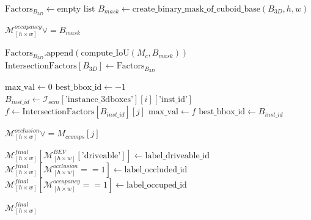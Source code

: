 \begin{algorithm}
\begin{algorithmic}[1]
             
                \State $\text{Factors}_{B_{3D}} \gets \text{empty list}$
                \State $B_{mask} \gets \text{create\_binary\_mask\_of\_cuboid\_base}(B_{3D}, h, w)$
                
                \State $\mathcal{M}^{occupancy}_{\left[h \times w\right]} \lor = B_{mask}$

                    \State $\text{Factors}_{B_{3D}}.\text{append}(\text{compute\_IoU}(M_{c}, B_{mask}))$
                \EndFor
                \State $\text{IntersectionFactors}[B_{3D}] \gets \text{Factors}_{B_{3D}}$
            \EndFor


             
                \State $\text{max\_val} \gets 0$
                \State $\text{best\_bbox\_id} \gets -1$
                    \State $B_{inst\_id} \gets \mathcal{I}_{sem}[\text{'instance\_3dboxes'}][i][\text{'inst\_id'}]$
                    \State $f \gets \text{IntersectionFactors}[B_{inst\_id}][j]$
                        \State $\text{max\_val} \gets f$
                        \State $\text{best\_bbox\_id} \gets B_{inst\_id}$
                    \EndIf
                \EndFor

                    \State $\mathcal{M}^{occlusion}_{\left[h \times w\right]} \lor = M_{ccomps}[j]$
                \EndIf
            \EndFor

        \EndFor
        
        \State $\mathcal{M}^{final}_{\left[h \times w\right]}[\mathcal{M}^{BEV}_{\left[h \times w\right]}[\text{'driveable'}]] \gets \text{label\_driveable\_id}$
        \State $\mathcal{M}^{final}_{\left[h \times w\right]}[\mathcal{M}^{occlusion}_{\left[h \times w\right]} == 1] \gets \text{label\_occluded\_id}$
        \State $\mathcal{M}^{final}_{\left[h \times w\right]}[\mathcal{M}^{occupancy}_{\left[h \times w\right]} == 1] \gets \text{label\_occuped\_id}$
        
        \State \Return $\mathcal{M}^{final}_{\left[h \times w\right]}$
    \end{algorithmic}
\end{algorithm}
\newpage


